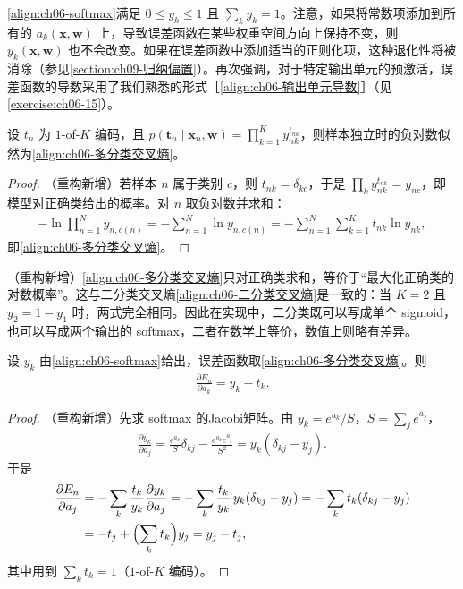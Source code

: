 \documentclass[../../main.tex]{subfiles}
\begin{document}
\eqref{align:ch06-softmax}满足 $0\leqslant y_k\leqslant1$ 且 $\sum_ky_k=1$。注意，如果将常数项添加到所有的 $a_k(\boldsymbol{x},\boldsymbol{w})$ 上，导致误差函数在某些权重空间方向上保持不变，则 $y_k(\boldsymbol{x},\boldsymbol{w})$ 也不会改变。如果在误差函数中添加适当的正则化项，这种退化性将被消除（参见\cref{section:ch09-归纳偏置}）。再次强调，对于特定输出单元的预激活，误差函数的导数采用了我们熟悉的形式［\eqref{align:ch06-输出单元导数}］（见\cref{exercise:ch06-15}）。

\begin{proposition}[多分类交叉熵是负对数似然]\label{proposition:ch06-多分类交叉熵}
设 $t_n$ 为 $1$-of-$K$ 编码，且 $p(\boldsymbol{t}_n\mid\boldsymbol{x}_n,\boldsymbol{w})=\prod_{k=1}^{K}y_{nk}^{t_{nk}}$，则样本独立时的负对数似然为\eqref{align:ch06-多分类交叉熵}。
\end{proposition}

\begin{proof}
（重构新增）若样本 $n$ 属于类别 $c$，则 $t_{nk}=\delta_{kc}$，于是 $\prod_k y_{nk}^{t_{nk}}=y_{nc}$，即模型对正确类给出的概率。对 $n$ 取负对数并求和：
\begin{align}
-\ln\prod_{n=1}^{N}y_{n,c(n)}=-\sum_{n=1}^{N}\ln y_{n,c(n)}=-\sum_{n=1}^{N}\sum_{k=1}^{K}t_{nk}\ln y_{nk},
\end{align}
即\eqref{align:ch06-多分类交叉熵}。
\end{proof}

\begin{remark}（重构新增）\eqref{align:ch06-多分类交叉熵}只对正确类求和，等价于“最大化正确类的对数概率”。这与二分类交叉熵\eqref{align:ch06-二分类交叉熵}是一致的：当 $K=2$ 且 $y_2=1-y_1$ 时，两式完全相同。因此在实现中，二分类既可以写成单个 sigmoid，也可以写成两个输出的 softmax，二者在数学上等价，数值上则略有差异。
\end{remark}

\begin{proposition}\label{proposition:ch06-softmax输出导数}
设 $y_k$ 由\eqref{align:ch06-softmax}给出，误差函数取\eqref{align:ch06-多分类交叉熵}。则
\begin{align}
\frac{\partial E_n}{\partial a_k}=y_k-t_k .
\label{align:ch06-softmax输出导数}
\end{align}
\end{proposition}

\begin{proof}
（重构新增）先求 softmax 的Jacobi矩阵。由 $y_k=e^{a_k}/S$，$S=\sum_j e^{a_j}$，
\begin{align}
\frac{\partial y_k}{\partial a_j}=\frac{e^{a_k}}{S}\delta_{kj}-\frac{e^{a_k}e^{a_j}}{S^{2}}=y_k(\delta_{kj}-y_j).
\end{align}
于是
\begin{align}
\frac{\partial E_n}{\partial a_j}
&=-\sum_{k}\frac{t_k}{y_k}\frac{\partial y_k}{\partial a_j}
=-\sum_{k}\frac{t_k}{y_k}\,y_k(\delta_{kj}-y_j)
=-\sum_{k}t_k(\delta_{kj}-y_j)\nonumber\\
&=-t_j+\Bigl(\sum_{k}t_k\Bigr)y_j=y_j-t_j,
\end{align}
其中用到 $\sum_kt_k=1$（$1$-of-$K$ 编码）。
\end{proof}
\end{document}
